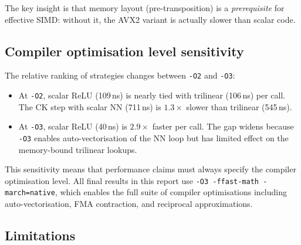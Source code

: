 \documentclass[11pt,a4paper]{article}
\begin{document}
The key insight is that memory layout (pre-transposition) is a
\emph{prerequisite} for effective SIMD: without it, the AVX2 variant
is actually slower than scalar code.


\subsection{Compiler optimisation level sensitivity}
\label{sec:compiler}

The relative ranking of strategies changes between \texttt{-O2} and
\texttt{-O3}:

\begin{itemize}
    \item At \texttt{-O2}, scalar ReLU (109\,ns) is nearly tied with
          trilinear (106\,ns) per call.  The CK step with scalar NN
          (711\,ns) is $1.3\times$ slower than trilinear (545\,ns).

    \item At \texttt{-O3}, scalar ReLU (40\,ns) is $2.9\times$ faster
          per call.  The gap widens because \texttt{-O3} enables
          auto-vectorisation of the NN loop but has limited effect
          on the memory-bound trilinear lookups.
\end{itemize}

This sensitivity means that performance claims must always specify the
compiler optimisation level.  All final results in this report use
\texttt{-O3~-ffast-math~-march=native}, which enables the full suite
of compiler optimisations including auto-vectorisation, FMA contraction,
and reciprocal approximations.


\subsection{Limitations}
\end{document}
